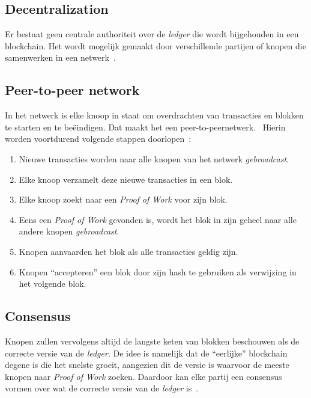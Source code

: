 \subsection{Decentralization}
\label{sub:decentralization}

Er bestaat geen centrale authoriteit over de \textit{ledger} die wordt bijgehouden in een blockchain. Het wordt mogelijk gemaakt door verschillende partijen of knopen die samenwerken in een netwerk~\autocite{Anita2019}.

\subsection{Peer-to-peer network}
\label{sub:peer-to-peer-network}

In het netwerk is elke knoop in staat om overdrachten van transacties en blokken te starten en te beëindigen. Dat maakt het een peer-to-peernetwerk.~\autocite{Davidson2016} Hierin worden voortdurend volgende stappen doorlopen~\autocite{Nakamoto2008}:

\begin{enumerate}
	\item Nieuwe transacties worden naar alle knopen van het netwerk \textit{gebroadcast}.
	\item Elke knoop verzamelt deze nieuwe transacties in een blok.
	\item Elke knoop zoekt naar een \textit{Proof of Work} voor zijn blok.
	\item Eens een \textit{Proof of Work} gevonden is, wordt het blok in zijn geheel naar alle andere knopen \textit{gebroadcast}.
	\item Knopen aanvaarden het blok als alle transacties geldig zijn.
	\item Knopen ``accepteren'' een blok door zijn hash te gebruiken als verwijzing in het volgende blok.
\end{enumerate}

\subsection{Consensus}
\label{sub:consensus}

Knopen zullen vervolgens altijd de langste keten van blokken beschouwen als de correcte versie van de \textit{ledger}. De idee is namelijk dat de ``eerlijke'' blockchain degene is die het snelste groeit, aangezien dit de versie is waarvoor de meeste knopen naar \textit{Proof of Work} zoeken. Daardoor kan elke partij een consensus vormen over wat de correcte versie van de \textit{ledger} is~\autocite{Anita2019}.

